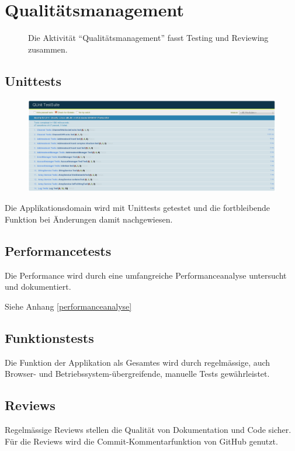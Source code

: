 \chapter{Qualitätsmanagement}
	\begin{figure}[H]
		\centering
		{\tiny
		}
		\caption{Die Aktivität "`Qualitätsmanagement"' fasst Testing und Reviewing
		zusammen.}
	\end{figure}


	\section{Unittests}		
		\begin{figure}[H]
			\centering
			\includegraphics[width=1\textwidth]{../qualityManagement/unittesting.png}
			\label{unittests}
		\end{figure}
		Die Applikationsdomain wird mit Unittests getestet und die fortbleibende
		Funktion bei Änderungen damit nachgewiesen.
		
	\section{Performancetests}
		Die Performance wird durch eine umfangreiche Performanceanalyse untersucht und dokumentiert.
		
		Siehe Anhang \ref{performanceanalyse}
		
	\section{Funktionstests}
		Die Funktion der Applikation als Gesamtes wird durch regelmässige, auch
		Browser- und Betriebssystem-übergreifende, manuelle Tests gewährleistet.
		
	\section{Reviews}
		Regelmässige Reviews stellen die Qualität von Dokumentation und Code sicher. Für die Reviews wird die Commit-Kommentarfunktion von GitHub genutzt.
